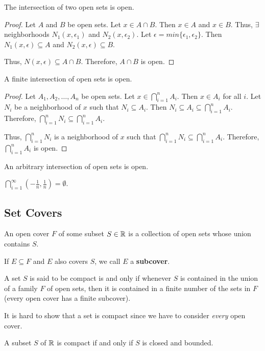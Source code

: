 \begin{theorem}
    The intersection of two open sets is open.
\end{theorem}
\begin{proof}
    Let $A$ and $B$ be open sets. Let $x \in A \cap B$. Then $x \in A$ and $x \in B$. Thus, $\exists$ neighborhoods $N_1(x, \epsilon_1)$ and $N_2(x, \epsilon_2)$. Let $\epsilon = min\{\epsilon_1, \epsilon_2\}$. Then $N_1(x, \epsilon) \subseteq A$ and $N_2(x, \epsilon) \subseteq B$. 
    
    Thus, $N(x, \epsilon) \subseteq A \cap B$. Therefore, $A \cap B$ is open.
\end{proof}

\begin{theorem}
    A finite intersection of open sets is open.
\end{theorem}
\begin{proof}
    Let $A_1, A_2, \ldots, A_n$ be open sets. Let $x \in \bigcap_{i=1}^n A_i$. Then $x \in A_i$ for all $i$. Let $N_i$ be a neighborhood of $x$ such that $N_i \subseteq A_i$. Then $N_i \subseteq A_i \subseteq \bigcap_{i=1}^n A_i$. Therefore, $\bigcap_{i=1}^n N_i \subseteq \bigcap_{i=1}^n A_i$. 
    
    Thus, $\bigcap_{i=1}^n N_i$ is a neighborhood of $x$ such that $\bigcap_{i=1}^n N_i \subseteq \bigcap_{i=1}^n A_i$. Therefore, $\bigcap_{i=1}^n A_i$ is open.
\end{proof}

\begin{theorem}
    An arbitrary intersection of open sets is open.
\end{theorem}
\begin{remark}[Counterexample]
    $\bigcap_{i=1}^\infty (-\frac{1}{n}, \frac{1}{n}) = \emptyset$.
\end{remark}

\subsection{Set Covers}
\begin{definition}
    An open cover $F$ of some subset $S \in \mathbb{R}$ is a collection of open sets whose union contains $S$.
\end{definition}
\begin{remark}
    If $E \subseteq F$ and $E$ also covers $S$, we call $E$ a \textbf{subcover}.
\end{remark}

\begin{definition}[Compact]
    A set $S$ is said to be compact is and only if whenever $S$ is contained in the union of a family $F$ of open sets, then it is contained in a finite number of the sets in $F$ (every open cover has a finite subcover).
\end{definition}
\begin{remark}
    It is hard to show that a set is compact since we have to consider \emph{every} open cover.
\end{remark}

\begin{theorem}
    A subset $S$ of $\mathbb{R}$ is compact if and only if $S$ is closed and bounded.
\end{theorem}